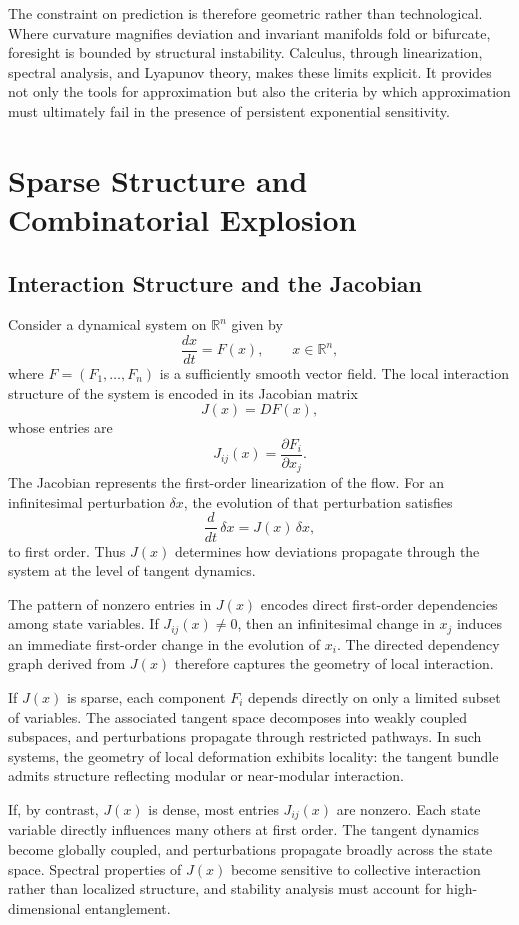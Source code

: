 \documentclass[12pt]{book}
\begin{document}
The constraint on prediction is therefore geometric rather than technological. Where curvature magnifies deviation and invariant manifolds fold or bifurcate, foresight is bounded by structural instability. Calculus, through linearization, spectral analysis, and Lyapunov theory, makes these limits explicit. It provides not only the tools for approximation but also the criteria by which approximation must ultimately fail in the presence of persistent exponential sensitivity.

\chapter{Sparse Structure and Combinatorial Explosion}

\section{Interaction Structure and the Jacobian}

Consider a dynamical system on $\mathbb{R}^n$ given by
\[
\frac{dx}{dt} = F(x),
\qquad x \in \mathbb{R}^n,
\]
where $F = (F_1,\dots,F_n)$ is a sufficiently smooth vector field. The local interaction structure of the system is encoded in its Jacobian matrix
\[
J(x) = D F(x),
\]
whose entries are
\[
J_{ij}(x) = \frac{\partial F_i}{\partial x_j}.
\]
The Jacobian represents the first-order linearization of the flow. For an infinitesimal perturbation $\delta x$, the evolution of that perturbation satisfies
\[
\frac{d}{dt}\,\delta x = J(x)\,\delta x,
\]
to first order. Thus $J(x)$ determines how deviations propagate through the system at the level of tangent dynamics.

The pattern of nonzero entries in $J(x)$ encodes direct first-order dependencies among state variables. If $J_{ij}(x) \neq 0$, then an infinitesimal change in $x_j$ induces an immediate first-order change in the evolution of $x_i$. The directed dependency graph derived from $J(x)$ therefore captures the geometry of local interaction.

If $J(x)$ is sparse, each component $F_i$ depends directly on only a limited subset of variables. The associated tangent space decomposes into weakly coupled subspaces, and perturbations propagate through restricted pathways. In such systems, the geometry of local deformation exhibits locality: the tangent bundle admits structure reflecting modular or near-modular interaction.

If, by contrast, $J(x)$ is dense, most entries $J_{ij}(x)$ are nonzero. Each state variable directly influences many others at first order. The tangent dynamics become globally coupled, and perturbations propagate broadly across the state space. Spectral properties of $J(x)$ become sensitive to collective interaction rather than localized structure, and stability analysis must account for high-dimensional entanglement.
\end{document}
